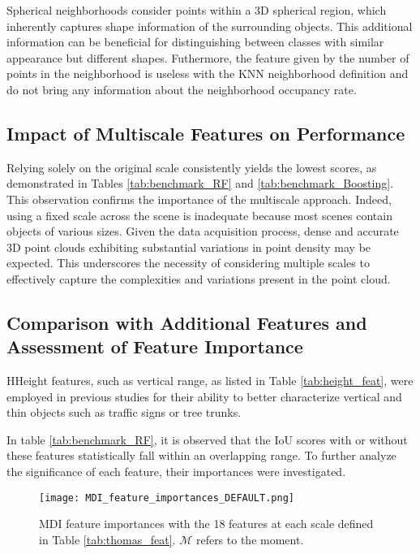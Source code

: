 \documentclass{article}
\begin{document}
Spherical neighborhoods consider points within a 3D spherical region, which inherently captures shape information of the surrounding objects. This additional information can be beneficial for distinguishing between classes with similar appearance but different shapes. Futhermore, the feature given by the number of points in the neighborhood is useless with the KNN neighborhood definition and do not bring any information about the neighborhood occupancy rate. 

\subsection{Impact of Multiscale Features on Performance}\label{sec:w/o_multiscale}
Relying solely on the original scale consistently yields the lowest scores, as demonstrated in Tables \ref{tab:benchmark_RF} and \ref{tab:benchmark_Boosting}. This observation confirms the importance of the multiscale approach. Indeed, using a fixed scale across the scene is inadequate because most scenes contain objects of various sizes. Given the data acquisition process, dense and accurate 3D point clouds exhibiting substantial variations in point density may be expected. This underscores the necessity of considering multiple scales to effectively capture the complexities and variations present in the point cloud.


\subsection{Comparison with Additional Features and Assessment of Feature Importance}\label{sec:compare_w/o_height}

HHeight features, such as vertical range, as listed in Table \ref{tab:height_feat}, were employed in previous studies \cite{hackel_fast_nodate,mohamed_improvement_2022} for their ability to better characterize vertical and thin objects such as traffic signs or tree trunks. 

In table \ref{tab:benchmark_RF}, it is observed that the IoU scores with or without these features statistically fall within an overlapping range. To further analyze the significance of each feature, their importances were investigated. 

\begin{figure}
    \hspace*{-2cm}  
        \texttt{[image: MDI\_feature\_importances\_DEFAULT.png]}
        \caption{MDI feature importances with the 18 features at each scale defined in Table \ref{tab:thomas_feat}. $\mathcal{M}$ refers to the moment. }
        \label{fig:MDI_default}
\end{figure}
\end{document}
